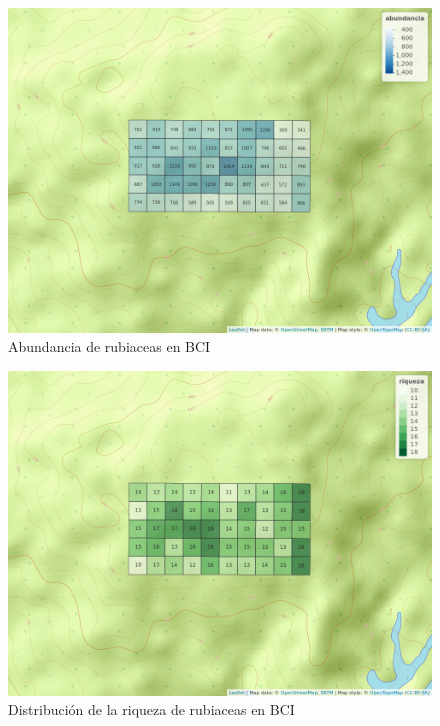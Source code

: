 \documentclass[11pt,]{article}
\begin{document}
\begin{figure}
\centering
\includegraphics{mapa_cuadros_abun_rubic.png}
\caption{Abundancia de rubiaceas en BCI
\label{fig:mapa_cuadros_abun_rubic}}
\end{figure}

\begin{figure}
\centering
\includegraphics{mapa_cuadros_riq_rubic.png}
\caption{Distribución de la riqueza de rubiaceas en BCI
\label{fig:mapa_cuadros_riq}}
\end{figure}
\end{document}
